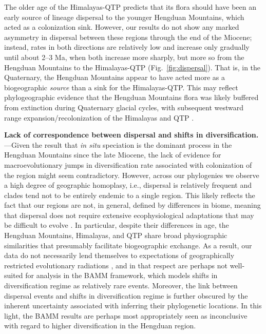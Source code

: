
The older age of the Himalayas-QTP predicts that its flora should have been an early source of lineage dispersal to the younger Hengduan Mountains, which acted as a colonization sink. However, our results do not show any marked asymmetry in dispersal between these regions through the end of the Miocene; instead, rates in both directions are relatively low and increase only gradually until about 2--3 Ma, when both increase more sharply, but more so from the Hengduan Mountains to the Himalayas-QTP (Fig.~\ref{fig:dispersal}). That is, in the Quaternary, the Hengduan Mountains appear to have acted more as a biogeographic \textit{source} than a sink for the Himalayas-QTP. This may reflect phylogeographic evidence that the Hengduan Mountains flora was likely buffered from extinction during Quaternary glacial cycles, with subsequent westward range expansion/recolonization of the Himalayas and QTP \citep[e.g.,][]{WangBS2011,CunY2010}. 


\textbf{Lack of correspondence between dispersal and shifts in diversification.}---Given the result that \textit{in situ} speciation is the dominant process in the Hengduan Mountains since the late Miocene, the lack of evidence for macroevolutionary jumps in diversification rate associated with colonization of the region might seem contradictory. However, across our phylogenies we observe a high degree of geographic homoplasy, i.e., dispersal is relatively frequent and clades tend not to be entirely endemic to a single region. This likely reflects the fact that our regions are not, in general, defined by differences in biome, meaning that dispersal does not require extensive ecophysiological adaptations that may be difficult to evolve \citep{Donoghue2014}. In particular, despite their differences in age, the Hengduan Mountains, Himalayas, and QTP share broad physiographic similarities that presumably facilitate biogeographic exchange. As a result, our data do not necessarily lend themselves to expectations of geographically restricted evolutionary radiations \citep[cf.][]{Hughes2006}, and in that respect are perhaps not well-suited for analysis in the BAMM framework, which models shifts in diversification regime as relatively rare events. Moreover, the link between dispersal events and shifts in diversification regime is further obscured by the inherent uncertainty associated with inferring their phylogenetic locations. In this light, the BAMM results are perhaps most appropriately seen as inconclusive with regard to higher diversification in the Hengduan region.

